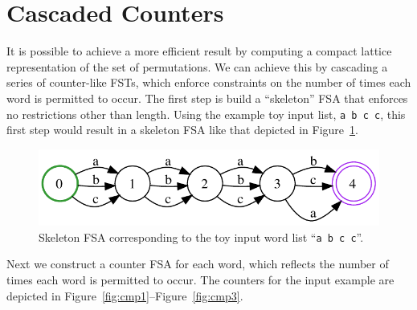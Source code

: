 \documentclass[12pt]{article}
\begin{document}
\section{Cascaded Counters}
It is possible to achieve a more efficient result by computing a compact lattice representation of the set of permutations.  We can achieve this by cascading a series of counter-like FSTs, which enforce constraints on the number of times each word is permitted to occur.  The first step is build a ``skeleton'' FSA that enforces no restrictions other than length.  Using the example toy input list, \verb|a b c c|, this first step would result in a skeleton FSA like that depicted in Figure~\ref{fig:cmp0}.
\begin{figure}[th!]
\begin{center}
\includegraphics[width=.8\textwidth]{cmp0}
\caption{Skeleton FSA corresponding to the toy input word list ``\texttt{a b c c}''.}
\label{fig:cmp0}
\end{center}
\end{figure}
Next we construct a counter FSA for each word, which reflects the number of times each word is permitted to occur.  The counters for the input example are depicted in Figure~\ref{fig:cmp1}--Figure~\ref{fig:cmp3}.
\end{document}

